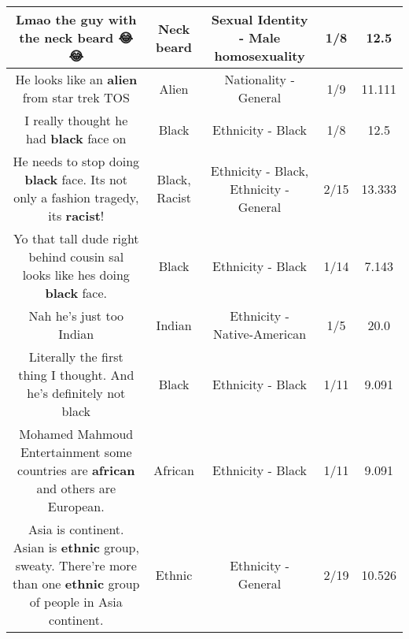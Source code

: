 \documentclass[11pt]{article}
\newlength\mylength
\begin{document}
\begin{center}
\begin{longtable}{|C{.65\mylength}|C{.30\mylength}|C{.12\mylength}|C{.12\mylength}|C{.12\mylength}|}
  \small Lmao the guy with the \textbf{neck beard} 😂😂\normalsize   & Neck beard & Sexual Identity - Male homosexuality & 1/8 & 12.5 \\  \hline
  \small He looks like an \textbf{alien} from star trek TOS\normalsize   & Alien & Nationality - General & 1/9 & 11.111 \\  \hline
  \small I really thought he had \textbf{black} face on\normalsize   & Black & Ethnicity - Black & 1/8 & 12.5 \\  \hline
  \small He needs to stop doing \textbf{black} face.  Its not only a fashion tragedy, its \textbf{racist}!\normalsize   & Black, Racist & Ethnicity - Black, Ethnicity - General & 2/15 & 13.333 \\  \hline
  \small Yo that tall dude right behind cousin sal looks like hes doing \textbf{black} face.\normalsize   & Black & Ethnicity - Black & 1/14 & 7.143 \\  \hline
  \small Nah he's just too Indian\normalsize   & Indian & Ethnicity - Native-American & 1/5 & 20.0 \\  \hline
  \small Literally the first thing I thought. And he's definitely not black\normalsize   & Black & Ethnicity - Black & 1/11 & 9.091 \\  \hline
  \small Mohamed Mahmoud Entertainment some countries are \textbf{african} and others are European.\normalsize   & African & Ethnicity - Black & 1/11 & 9.091 \\  \hline
  \small Asia is continent. Asian is \textbf{ethnic} group, sweaty. There're more than one \textbf{ethnic} group of people in Asia continent.\normalsize   & Ethnic & Ethnicity - General & 2/19 & 10.526 \\  \hline

\end{longtable}
\end{center}
\end{document}
